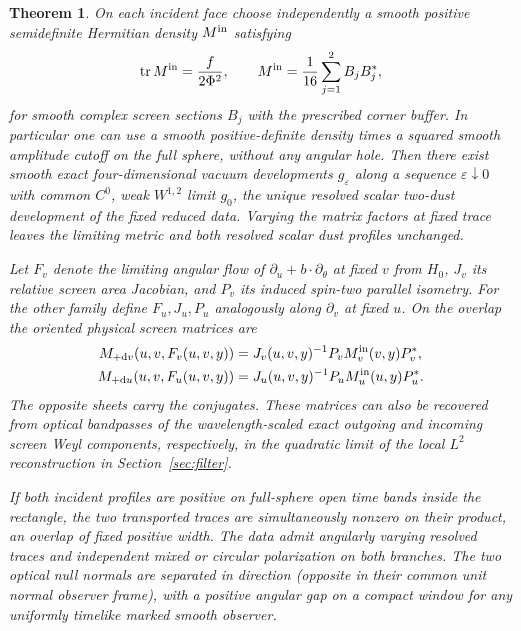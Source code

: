 \documentclass[11pt]{article}
\newtheorem{theorem}{Theorem}
\newcommand{\eps}{\varepsilon}
\newcommand{\Tr}{\operatorname{tr}}
\newcommand{\dd}{\mathrm d}
\begin{document}
\begin{theorem}\label{thm:main}
On each incident face choose independently a smooth positive semidefinite Hermitian density $M^{\rm in}$ satisfying
\[
 \Tr M^{\rm in}=\frac{f}{2\Phi^2},\qquad
 M^{\rm in}=\frac1{16}\sum_{j=1}^2 B_jB_j^*,
\]
for smooth complex screen sections $B_j$ with the prescribed corner buffer. In particular one can use a smooth positive-definite density times a squared smooth amplitude cutoff on the full sphere, without any angular hole. Then there exist smooth exact four-dimensional vacuum developments $g_\eps$ along a sequence $\eps\downarrow0$ with common $C^0$, weak $W^{1,2}$ limit $g_0$, the unique resolved scalar two-dust development of the fixed reduced data. Varying the matrix factors at fixed trace leaves the limiting metric and both resolved scalar dust profiles unchanged.

Let $F_v$ denote the limiting angular flow of $\partial_u+b\cdot\partial_\theta$ at fixed $v$ from $H_0$, $J_v$ its relative screen area Jacobian, and $P_v$ its induced spin-two parallel isometry. For the other family define $F_u,J_u,P_u$ analogously along $\partial_v$ at fixed $u$. On the overlap the oriented physical screen matrices are
\[
 \begin{split}
 M_{+\dd v}(u,v,F_v(u,v,y))
   &=J_v(u,v,y)^{-1}P_v M_v^{\rm in}(v,y)P_v^*,\\
 M_{+\dd u}(u,v,F_u(u,v,y))
   &=J_u(u,v,y)^{-1}P_u M_u^{\rm in}(u,y)P_u^*.
 \end{split}
\]
The opposite sheets carry the conjugates. These matrices can also be recovered from optical bandpasses of the wavelength-scaled exact outgoing and incoming screen Weyl components, respectively, in the quadratic limit of the local $L^2$ reconstruction in Section~\ref{sec:filter}.

If both incident profiles are positive on full-sphere open time bands inside the rectangle, the two transported traces are simultaneously nonzero on their product, an overlap of fixed positive width. The data admit angularly varying resolved traces and independent mixed or circular polarization on both branches. The two optical null normals are separated in direction (opposite in their common unit normal observer frame), with a positive angular gap on a compact window for any uniformly timelike marked smooth observer.
\end{theorem}
\end{document}
